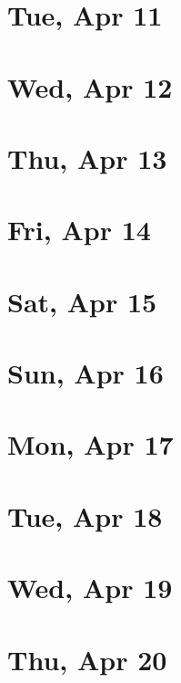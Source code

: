 	\section{Tue, Apr 11}
		
	\section{Wed, Apr 12}
		
	\section{Thu, Apr 13}
		
	\section{Fri, Apr 14}
		
	\section{Sat, Apr 15}
		
	\section{Sun, Apr 16}
		
	\section{Mon, Apr 17}
		
	\section{Tue, Apr 18}
		
	\section{Wed, Apr 19}
		
	\section{Thu, Apr 20}
		
